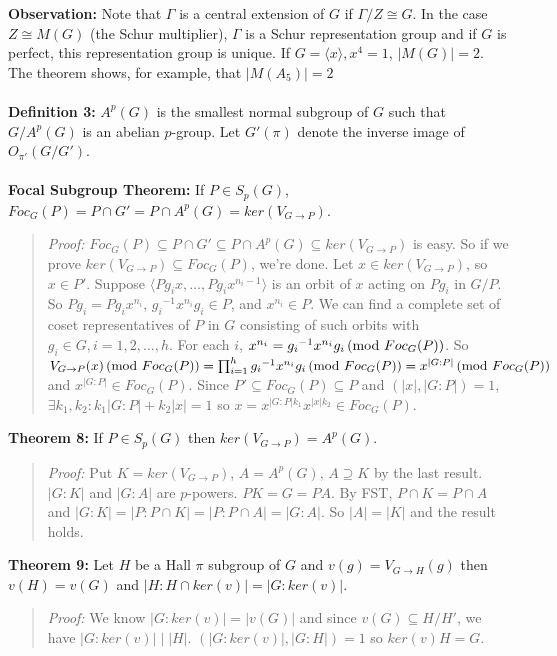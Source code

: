 {\bf Observation:} Note that $\Gamma$ is a central extension of $G$ if $\Gamma/Z \cong G$.
In the case $Z \cong M(G)$ (the Schur multiplier), $\Gamma$ is a Schur representation group and
if $G$ is perfect, this representation group is unique.  
If $G= \langle x \rangle , x^4=1$, $|M(G)|=2$.  The
theorem shows, for example, that $|M(A_5)|=2$
\\
\\
{\bf Definition 3:} $A^p(G)$ is the smallest normal subgroup of $G$ such that
$G/A^p(G)$ is an abelian $p$-group. Let $G'(\pi)$ denote the inverse image of
$O_{\pi'}(G/G')$.
\\
\\
{\bf Focal Subgroup Theorem:}  
If $P \in S_p(G)$, $Foc_G(P) = P \cap G' = P \cap A^p(G) = ker(V_{G \rightarrow P})$.
\begin{quote}
\emph{Proof:}  
$Foc_G(P) \subseteq  P \cap G' \subseteq  P \cap A^p(G)  \subseteq ker(V_{G \rightarrow P})$ is
easy.  So if we prove
$ker(V_{G \rightarrow P}) \subseteq Foc_G(P)$, we're done.  Let $x \in ker(V_{G \rightarrow P})$, so $x \in P'$.
Suppose $\langle Pg_i x, \ldots , P g_i x^{n_i - 1} \rangle$ is an orbit of $x$ acting on $Pg_i$ in $G/P$. So $Pg_i = Pg_i x^{n_i}$,
${g_i}^{-1} x^{n_i} g_i \in P$, and $x^{n_i} \in P$.  
We can find a complete set of coset representatives of $P$ in $G$ consisting of such orbits with $g_i \in G, i = 1,2, \ldots, h$.
For each $i$, $x^{n_i} = {g_i}^{-1} x^{n_i} g_i \thinspace \textnormal{(mod } Foc_G(P) \textnormal{)}$.  So 
$V_{G \rightarrow P}(x) \thinspace \textnormal{(mod } Foc_G(P) \textnormal{)} = \prod_{i=1}^h {g_i}^{-1} x^{n_i} g_i \thinspace \textnormal{(mod } Foc_G(P) \textnormal{)} = x^{|G:P|} \thinspace \textnormal{(mod } Foc_G(P) \textnormal{)}$
and  $x^{|G:P|} \in Foc_G(P)$.  Since $P' \subseteq Foc_G(P) \subseteq P$ and $(|x|, |G:P|) =1$, $\exists k_1, k_2: k_1|G:P| + k_2|x| = 1$
so $x = x^{|G:P| k_1} x^{|x| k_2} \in Foc_G(P)$.
\end{quote}
{\bf Theorem 8:}  
If $P \in S_p(G)$ then $ker(V_{G \rightarrow P})= A^p(G)$.
\begin{quote}
\emph{Proof:}  
Put $K= ker(V_{G \rightarrow P})$, $A= A^p(G)$,  $A \supseteq K$ by the last result.
$|G:K|$ and $|G:A|$ are $p$-powers.  $PK=G=PA$.  By FST, $P \cap K = P \cap A$ and
$|G:K|= |P:P \cap K|= |P: P \cap A|= |G:A|$.  So $|A|= |K|$ and the result holds.
\end{quote}
{\bf Theorem 9:}  
Let $H$ be a Hall $\pi$ subgroup of $G$ and $v(g)= V_{G \rightarrow H}(g)$ then
$v(H)=v(G)$ and $|H: H \cap ker(v)|= |G:ker(v)|$.
\begin{quote}
\emph{Proof:}  
We know $|G:ker(v)| = |v(G)|$ and since
$v(G) \subseteq H/H'$, we have $|G:ker(v)| \mid |H|$.  $(|G:ker(v)|, |G:H|)=1$ so
$ker(v)H=G$.
\end{quote}
